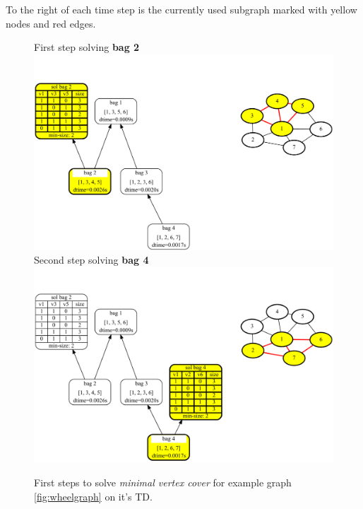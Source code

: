 \documentclass[a4paper, 12pt, bibliography=totoc]{scrartcl}
\begin{document}
To the right of each time step is the currently used subgraph marked with yellow nodes and red edges.


\begin{figure}[H]
	\centering
		First step solving \textbf{bag 2}
	\includegraphics[width=0.9\linewidth]{images/WheelGraph7/combined2.pdf} \vspace{1em}\\
	Second step solving \textbf{bag 4}\\
	
		\includegraphics[width=0.9\linewidth]{images/WheelGraph7/combined3.pdf}
	\caption{First steps to solve \textit{minimal vertex cover} for example graph \ref{fig:wheelgraph} on it's TD.}
	\label{fig:wheelgraphc23}
\end{figure}
\end{document}
